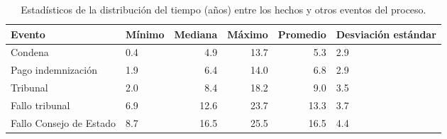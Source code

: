 \begin{table}[htbp]
\centering
\caption{Estadísticos de la distribución del
tiempo (años) entre los hechos y otros eventos del proceso.} 
\label{tab:hechos-evento}
\begin{tabular}{llrrrR{2cm}}
  \hline
Evento & Mínimo & Mediana & Máximo & Promedio & Desviación estándar \\ 
  \hline
Condena & 0.4 & 4.9 & 13.7 & 5.3 & 2.9 \\ 
  Pago indemnización & 1.9 & 6.4 & 14.0 & 6.8 & 2.9 \\ 
  Tribunal & 2.0 & 8.4 & 18.2 & 9.0 & 3.5 \\ 
  Fallo tribunal & 6.9 & 12.6 & 23.7 & 13.3 & 3.7 \\ 
  Fallo Consejo de Estado & 8.7 & 16.5 & 25.5 & 16.5 & 4.4 \\ 
   \hline
\end{tabular}
\end{table}
